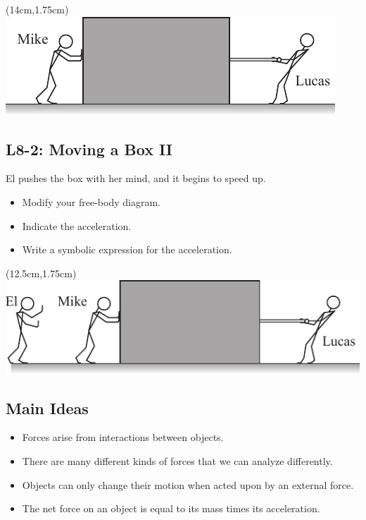 \documentclass[]{article}
\begin{document}
\begin{textblock*}{5cm}(14cm,1.75cm)
\centering
\includegraphics[scale=1.5]{Mike_and_Lucas_Fruitlessly_Push_a_Box.pdf}
\end{textblock*}
\newpage
\begin{TeacherMargin}

\end{TeacherMargin}
\begin{PresentSpace}
\vspace{-10pt}
\section*{L8-2: Moving a Box II}
\vspace{100pt}
El pushes the box with her mind, and it begins to speed up.
\begin{itemize}
	\item Modify your free-body diagram.
	\item Indicate the acceleration.
	\item Write a symbolic expression for the acceleration.
\end{itemize}
\end{PresentSpace}
\begin{textblock*}{5cm}(12.5cm,1.75cm)
\centering
\includegraphics[scale=1.5]{Eleven_Helps_Mike_and_Lucas_Push_a_Box.pdf}
\end{textblock*}
\newpage
\begin{TeacherMargin}
	
\end{TeacherMargin}
\begin{PresentSpace}
\section*{Main Ideas}
\begin{itemize}
	\item Forces arise from interactions between objects.
	\item There are many different kinds of forces that we can analyze differently.
	\item Objects can only change their motion when acted upon by an external force.
	\item The net force on an object is equal to its mass times its acceleration.
\end{itemize}
\end{PresentSpace}
\end{document}
